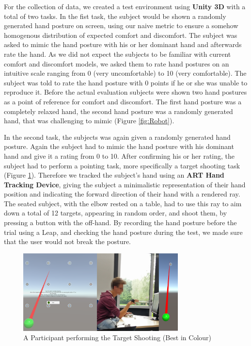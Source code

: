 \documentclass{sig-alternate-05-2015}
\begin{document}
For the collection of data, we created a test environment using \textbf{Unity 3D} with a total of two tasks. In the fist task, the subject would be shown a randomly generated hand posture on screen, using our naive metric to ensure a somehow homogenous distribution of expected comfort and discomfort. The subject was asked to mimic the hand posture with his or her dominant hand and afterwards rate the hand. As we did not expect the subjects to be familiar with current comfort and discomfort models, we asked them to rate hand postures on an intuitive scale ranging from 0 (very uncomfortable) to 10 (very comfortable). The subject was told to rate the hand posture with 0 points if he or she was unable to reproduce it. Before the actual evaluation subjects were shown two hand postures as a point of reference for comfort and discomfort. The first hand posture was a completely relaxed hand, the second hand posture was a randomly generated hand, that was challenging to mimic (Figure \ref{fig:Robot}).

In the second task, the subjects was again given a randomly generated hand posture. Again the subject had to mimic the hand posture with his dominant hand and give it a rating from 0 to 10. After confirming his or her rating, the subject had to perform a pointing task, more specifically a target shooting task (Figure \ref{fig:participant}). Therefore we tracked the subject's hand using an \textbf{ART Hand Tracking Device}, giving the subject a minimalistic representation of their hand position and indicating the forward direction of their hand with a rendered ray. The seated subject, with the elbow rested on a table, had to use this ray to aim down a total of 12 targets, appearing in random order, and shoot them, by pressing a button with the off-hand. By recording the hand posture before the trial using a Leap, and checking the hand posture during the test, we made sure that the user would not break the posture. 

\begin{figure}[h]
\centering
\includegraphics[width=8.45cm]{Participant}
\vspace{-20pt}
\caption{A Participant performing the Target Shooting (Best in Colour)}
\label{fig:participant}
\vspace{-10pt}
\end{figure}
\end{document}
